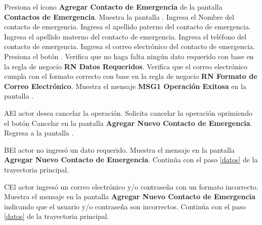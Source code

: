  \begin{UCtrayectoria}
 	
 	\UCpaso [\UCactor] Presiona el ícono \textbf{Agregar Contacto de Emergencia} de la pantalla \textbf{Contactos de Emergencia}.
 	\UCpaso Muestra la pantalla .
 	\UCpaso [\UCactor] Ingresa el Nombre del contacto de emergencia. \label{datos}
 	\UCpaso [\UCactor] Ingresa el apellido paterno del contacto de emergencia.
 	\UCpaso [\UCactor] Ingresa el apellido materno del contacto de emergencia.
 	\UCpaso [\UCactor] Ingresa el teléfono del contacto de emergencia.
 	\UCpaso [\UCactor] Ingresa el correo electrónico del contacto de emergencia.
 	\UCpaso [\UCactor] Presiona el botón . 
	\UCpaso Verifica que no haga falta ningún dato requerido con base en la regla de negocio \textbf{RN Datos Requeridos}. 
	\UCpaso Verifica que el correo electrónico cumpla con el formato correcto con base en la regla de negocio \textbf{RN Formato de Correo Electrónico}.
	\UCpaso Muestra el mensaje \textbf{MSG1 Operación Exitosa} en la pantalla .
    
 \end{UCtrayectoria}

 \begin{UCtrayectoriaA}{A}{El actor desea cancelar la operación.}
    \UCpaso[\UCactor] Solicita cancelar la operación oprimiendo el botón Cancelar en la pantalla \textbf{Agregar Nuevo Contacto de Emergencia}.
   \UCpaso Regresa a la pantalla .
 \end{UCtrayectoriaA}
 
 \begin{UCtrayectoriaA}{B}{El actor no ingresó un dato requerido.}
    \UCpaso[\UCsist] Muestra el mensaje  en la pantalla \textbf{Agregar Nuevo Contacto de Emergencia}.
    \UCpaso[] Continúa con el paso \ref{datos} de la trayectoria principal.
 \end{UCtrayectoriaA}
 
 \begin{UCtrayectoriaA}{C}{El actor ingresó un correo electrónico y/o contraseña con un formato incorrecto.}
    \UCpaso[\UCsist] Muestra el mensaje  en la pantalla \textbf{Agregar Nuevo Contacto de Emergencia} indicando que el usuario y/o contraseña son incorrectos.
    \UCpaso[] Continúa con el paso \ref{datos} de la trayectoria principal.
 \end{UCtrayectoriaA} 


 


